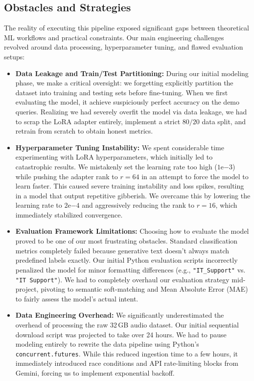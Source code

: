 \documentclass[unnumsec,webpdf,modern,large]{oup-authoring-template}%
\theoremstyle{thmstyleone}%
\theoremstyle{thmstyletwo}%
\theoremstyle{thmstylethree}%
\begin{document}
\subsection{Obstacles and Strategies}
The reality of executing this pipeline exposed significant gaps between theoretical ML workflows and practical constraints. Our main engineering challenges revolved around data processing, hyperparameter tuning, and flawed evaluation setups:
\begin{itemize}
    \item \textbf{Data Leakage and Train/Test Partitioning:} During our initial modeling phase, we make a critical oversight: we forgetting explicitly partition the dataset into training and testing sets before fine-tuning. When we first evaluating the model, it achieve suspiciously perfect accuracy on the demo queries. Realizing we had severely overfit the model via data leakage, we had to scrap the LoRA adapter entirely, implement a strict $80/20$ data split, and retrain from scratch to obtain honest metrics.
    \item \textbf{Hyperparameter Tuning Instability:} We spent considerable time experimenting with LoRA hyperparameters, which initially led to catastrophic results. We mistakenly set the learning rate too high ($1\mathrm{e}{-3}$) while pushing the adapter rank to $r=64$ in an attempt to force the model to learn faster. This caused severe training instability and loss spikes, resulting in a model that output repetitive gibberish. We overcame this by lowering the learning rate to $2\mathrm{e}{-4}$ and aggressively reducing the rank to $r=16$, which immediately stabilized convergence.
    \item \textbf{Evaluation Framework Limitations:} Choosing how to evaluate the model proved to be one of our most frustrating obstacles. Standard classification metrics completely failed because generative text doesn't always match predefined labels exactly. Our initial Python evaluation scripts incorrectly penalized the model for minor formatting differences (e.g., \texttt{"IT\_Support"} vs. \texttt{"IT Support"}). We had to completely overhaul our evaluation strategy mid-project, pivoting to semantic soft-matching and Mean Absolute Error (MAE) to fairly assess the model's actual intent.
    \item \textbf{Data Engineering Overhead:} We significantly underestimated the overhead of processing the raw 32\,GB audio dataset. Our initial sequential download script was projected to take over 24 hours. We had to pause modeling entirely to rewrite the data pipeline using Python's \texttt{concurrent.futures}. While this reduced ingestion time to a few hours, it immediately introduced race conditions and API rate-limiting blocks from Gemini, forcing us to implement exponential backoff.

\end{itemize}
\end{document}
